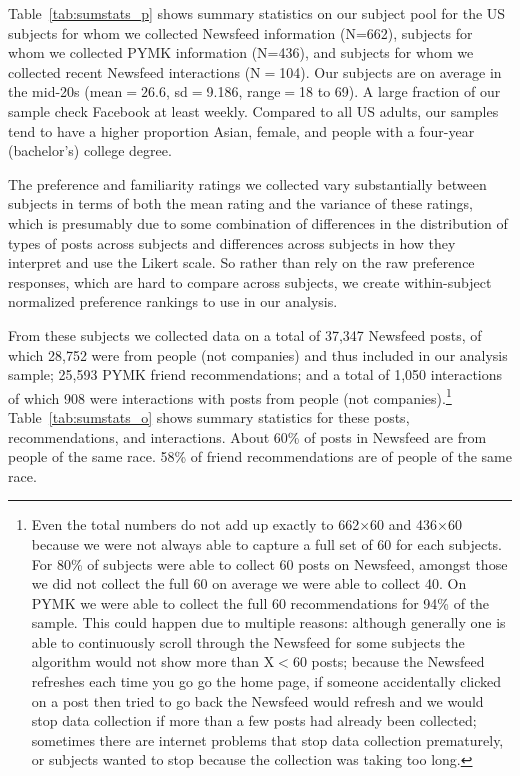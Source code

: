 \documentclass[12pt,letterpaper]{article}
\newcommand{\FullNFUSSurveySampleSize}{662}
\newcommand{\PYMKUSSurveySampleSize}{436}
\newcommand{\RecentInteractionsSampleSize}{104}
\newcommand{\numposts}{37,347}
\newcommand{\numhposts}{28,752}
\newcommand{\numrecs}{25,593}
\newcommand{\numinteract}{1,050}
\newcommand{\numhinteract}{908}
\begin{document}
Table~\ref{tab:sumstats_p} shows summary statistics on our subject pool for the US subjects for whom we collected Newsfeed information (N=\FullNFUSSurveySampleSize{}), subjects for whom we collected PYMK information (N=\PYMKUSSurveySampleSize{}), and subjects for whom we collected recent Newsfeed interactions (N$=$\RecentInteractionsSampleSize).  Our subjects are on average in the mid-20s (mean$=26.6$, sd$=$9.186, range$=$18 to 69). A large fraction of our sample check Facebook at least weekly. Compared to all US adults, our samples tend to have a higher proportion Asian, female, and people with a four-year (bachelor's) college degree. 

The preference and familiarity ratings we collected vary substantially between subjects in terms of both the mean rating and the variance of these ratings, which is presumably due to some combination of differences in the distribution of types of posts across subjects and differences across subjects in how they interpret and use the Likert scale. So rather than rely on the raw preference responses, which are hard to compare across subjects, we create within-subject normalized preference rankings to use in our analysis. 

From these subjects we collected data on a total of \numposts{} Newsfeed posts, of which \numhposts{} were from people (not companies) and thus included in our analysis sample; \numrecs{} PYMK friend recommendations; and a total of \numinteract{} interactions of which \numhinteract{} were interactions with posts from people (not companies).\footnote{Even the total numbers do not add up exactly to \FullNFUSSurveySampleSize{}$\times$60 and \PYMKUSSurveySampleSize{}$\times$60 because we were not always able to capture a full set of 60 for each subjects. For 80\% of subjects were able to collect 60 posts on Newsfeed, amongst those we did not collect the full 60 on average we were able to collect 40. On PYMK we were able to collect the full 60 recommendations for 94\% of the sample.  This could happen due to multiple reasons: although generally one is able to continuously scroll through the Newsfeed for some subjects the algorithm would not show more than X$<$60 posts; because the Newsfeed refreshes each time you go go the home page, if someone accidentally clicked on a post then tried to go back the Newsfeed would refresh and we would stop data collection if more than a few posts had already been collected; sometimes there are internet problems that stop data collection prematurely, or subjects wanted to stop because the collection was taking too long.} Table~\ref{tab:sumstats_o} shows summary statistics for these posts, recommendations, and interactions. About 60\% of posts in Newsfeed are from people of the same race. 58\% of friend recommendations are of people of the same race.
\end{document}
